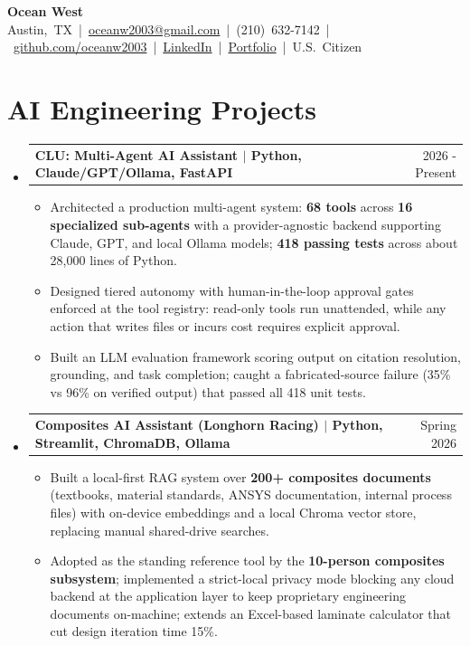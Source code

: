 \documentclass[letterpaper,10pt]{article}
\makeatletter
\newcommand{\resumeItem}[1]{\item\small{#1}}
\newcommand{\resumeProject}[2]{
  \item
  \begin{tabularx}{\textwidth}{@{}Xr@{}}
    \small\textbf{#1} & \small #2 \\
  \end{tabularx}\vspace{-3pt}
}
\makeatother
\begin{document}
\begin{center}
  {\huge \textbf{\color{accent} Ocean West}} \\[2pt]
  \mbox{\small Austin, TX \;|\; \href{mailto:oceanw2003@gmail.com}{oceanw2003@gmail.com} \;|\; (210) 632-7142 \;|\;
  \href{https://github.com/oceanw2003}{github.com/oceanw2003} \;|\;
  \href{https://www.linkedin.com/in/oceanw2003}{LinkedIn} \;|\;
  \href{https://ocean-west-portfolio.vercel.app/}{Portfolio} \;|\; U.S. Citizen}
\end{center}

\section{AI Engineering Projects}
\begin{itemize}[leftmargin=0in, label={}]
  \resumeProject{CLU: Multi-Agent AI Assistant $|$ Python, Claude/GPT/Ollama, FastAPI}{2026 - Present}
  \begin{itemize}
    \resumeItem{Architected a production multi-agent system: \textbf{68 tools} across \textbf{16 specialized sub-agents} with a provider-agnostic backend supporting Claude, GPT, and local Ollama models; \textbf{418 passing tests} across about 28,000 lines of Python.}
    \resumeItem{Designed tiered autonomy with human-in-the-loop approval gates enforced at the tool registry: read-only tools run unattended, while any action that writes files or incurs cost requires explicit approval.}
    \resumeItem{Built an LLM evaluation framework scoring output on citation resolution, grounding, and task completion; caught a fabricated-source failure (35\% vs 96\% on verified output) that passed all 418 unit tests.}
  \end{itemize}

  \resumeProject{Composites AI Assistant (Longhorn Racing) $|$ Python, Streamlit, ChromaDB, Ollama}{Spring 2026}
  \begin{itemize}
    \resumeItem{Built a local-first RAG system over \textbf{200+ composites documents} (textbooks, material standards, ANSYS documentation, internal process files) with on-device embeddings and a local Chroma vector store, replacing manual shared-drive searches.}
    \resumeItem{Adopted as the standing reference tool by the \textbf{10-person composites subsystem}; implemented a strict-local privacy mode blocking any cloud backend at the application layer to keep proprietary engineering documents on-machine; extends an Excel-based laminate calculator that cut design iteration time 15\%.}
  \end{itemize}


\end{itemize}
\end{document}
